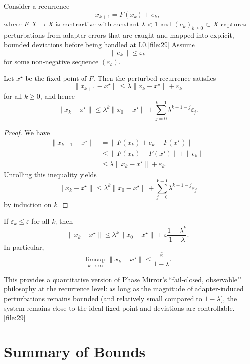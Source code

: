 \documentclass[11pt]{article}
\begin{document}
Consider a recurrence
\[
  x_{k+1} = F(x_k) + e_k,
\]
where \(F : X \to X\) is contractive with constant \(\lambda < 1\) and \((e_k)_{k\geq 0} \subset X\) captures perturbations from adapter errors that are caught and mapped into explicit, bounded deviations before being handled at L0.[file:29] Assume
\[
  \|e_k\| \leq \varepsilon_k
\]
for some non-negative sequence \((\varepsilon_k)\).

\begin{proposition}
\label{prop:perturbed}
Let \(x^\star\) be the fixed point of \(F\). Then the perturbed recurrence satisfies
\[
  \|x_{k+1} - x^\star\| \leq \lambda \|x_k - x^\star\| + \varepsilon_k
\]
for all \(k\geq 0\), and hence
\[
  \|x_k - x^\star\|
  \leq \lambda^k \|x_0 - x^\star\| + \sum_{j=0}^{k-1} \lambda^{k-1-j} \varepsilon_j.
\]
\end{proposition}

\begin{proof}
We have
\begin{align*}
  \|x_{k+1} - x^\star\|
  &= \|F(x_k) + e_k - F(x^\star)\| \\
  &\leq \|F(x_k) - F(x^\star)\| + \|e_k\| \\
  &\leq \lambda \|x_k - x^\star\| + \varepsilon_k.
\end{align*}
Unrolling this inequality yields
\[
  \|x_k - x^\star\|
  \leq \lambda^k \|x_0 - x^\star\| + \sum_{j=0}^{k-1} \lambda^{k-1-j} \varepsilon_j
\]
by induction on \(k\).
\end{proof}

\begin{corollary}
If \(\varepsilon_k \leq \overline{\varepsilon}\) for all \(k\), then
\[
  \|x_k - x^\star\|
  \leq \lambda^k \|x_0 - x^\star\|
       + \overline{\varepsilon} \frac{1-\lambda^k}{1-\lambda}.
\]
In particular,
\[
  \limsup_{k\to\infty} \|x_k - x^\star\|
  \leq \frac{\overline{\varepsilon}}{1-\lambda}.
\]
\end{corollary}

This provides a quantitative version of Phase Mirror’s ``fail-closed, observable’’ philosophy at the recurrence level: as long as the magnitude of adapter-induced perturbations remains bounded (and relatively small compared to \(1-\lambda\)), the system remains close to the ideal fixed point and deviations are controllable.[file:29]

\section{Summary of Bounds}
\end{document}
